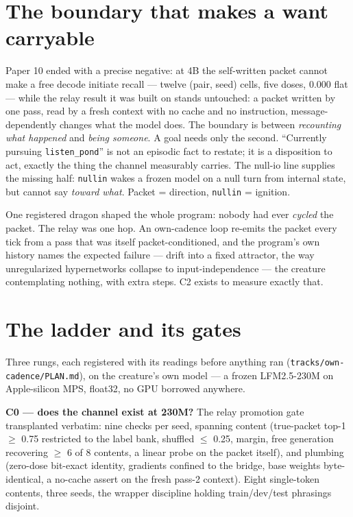 \documentclass[11pt]{article}
\begin{document}
\section{The boundary that makes a want carryable}

Paper 10 ended with a precise negative: at 4B the self-written packet
cannot make a free decode initiate recall --- twelve (pair, seed) cells,
five doses, 0.000 flat --- while the relay result it was built on stands
untouched: a packet written by one pass, read by a fresh context with no
cache and no instruction, message-dependently changes what the model
does. The boundary is between \emph{recounting what happened} and
\emph{being someone}. A goal needs only the second. ``Currently
pursuing \texttt{listen\_pond}'' is not an episodic fact to restate;
it is a disposition to act, exactly the thing the channel measurably
carries. The null-io line supplies the missing half: \texttt{nullin}
wakes a frozen model on a null turn from internal state, but cannot say
\emph{toward what}. Packet = direction, \texttt{nullin} = ignition.

One registered dragon shaped the whole program: nobody had ever
\emph{cycled} the packet. The relay was one hop. An own-cadence loop
re-emits the packet every tick from a pass that was itself
packet-conditioned, and the program's own history names the expected
failure --- drift into a fixed attractor, the way unregularized
hypernetworks collapse to input-independence --- the creature
contemplating nothing, with extra steps. C2 exists to measure exactly
that.

\section{The ladder and its gates}

Three rungs, each registered with its readings before anything ran
(\texttt{tracks/own-cadence/PLAN.md}), on the creature's own model ---
a frozen LFM2.5-230M on Apple-silicon MPS, float32, no GPU borrowed
anywhere.

\textbf{C0 --- does the channel exist at 230M?} The relay promotion
gate transplanted verbatim: nine checks per seed, spanning content
(true-packet top-1 $\geq$ 0.75 restricted to the label bank, shuffled
$\leq$ 0.25, margin, free generation recovering $\geq$ 6 of 8 contents,
a linear probe on the packet itself), and plumbing (zero-dose bit-exact
identity, gradients confined to the bridge, base weights byte-identical,
a no-cache assert on the fresh pass-2 context). Eight single-token
contents, three seeds, the wrapper discipline holding train/dev/test
phrasings disjoint.
\end{document}
